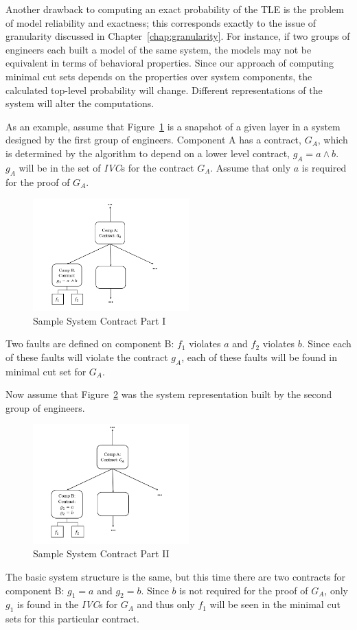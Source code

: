 Another drawback to computing an exact probability of the TLE is the problem of model reliability and exactness; this corresponds exactly to the issue of granularity discussed in Chapter~\ref{chap:granularity}. For instance, if two groups of engineers each built a model of the same system, the models may not be equivalent in terms of behavioral properties. Since our approach of computing minimal cut sets depends on the properties over system components, the calculated top-level probability will change. Different representations of the system will alter the computations.  

As an example, assume that Figure~\ref{fig:probComp1} is a snapshot of a given layer in a system designed by the first group of engineers. Component A has a contract, $G_A$, which is determined by the \aivcalg algorithm to depend on a lower level contract, $g_A = a \land b$. $g_A$ will be in the set of \textit{IVC}s for the contract $G_A$. Assume that only $a$ is required for the proof of $G_A$. 

\begin{figure}[h]
\begin{center}
\includegraphics[width=6cm]{images/probComp1.PNG}
\caption{Sample System Contract Part I} \label{fig:probComp1}
\end{center}
\end{figure}

Two faults are defined on component B: $f_1$ violates $a$ and $f_2$ violates $b$. Since each of these faults will violate the contract $g_A$, each of these faults will be found in minimal cut set for $G_A$.

Now assume that Figure~\ref{fig:probComp2} was the system representation built by the second group of engineers. 
\begin{figure}[h]
\begin{center}
\includegraphics[width=6cm]{images/probComp2.PNG}
\caption{Sample System Contract Part II} \label{fig:probComp2}
\end{center}
\end{figure} 
The basic system structure is the same, but this time there are two contracts for component B: $g_1 = a$ and $g_2 = b$. Since $b$ is not required for the proof of $G_A$, only $g_1$ is found in the \textit{IVC}s for $G_A$ and thus only $f_1$ will be seen in the minimal cut sets for this particular contract. 


